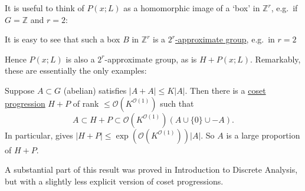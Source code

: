 \documentclass{article}
\numberwithin{equation}{section}
\begin{document}
It is useful to think of \hyperlink{def:prog}{$P(x;L)$} as a homomorphic image of a `box' in $\mathbb{Z}^r$, e.g.\ if $G = \mathbb{Z}$ and $r = 2$:
\begin{center}
\end{center}
It is easy to see that such a box $B$ in $\mathbb{Z}^r$ is a \hyperlink{def:appGroup}{$2^r$-approximate group}, e.g.\ in $r=2$

\begin{center}
\end{center}

Hence \hyperlink{def:prog}{$P(x;L)$} is also a $2^r$-approximate group, as is $H + P(x;L)$.
Remarkably, these are essentially the only examples:

\begin{nthm}[Freiman ($G=\mathbb{Z}$); Green-Ruzsa (arbitrary abelian $G$)]\label{thm:5.1}
  Suppose $A \subset G$ (abelian) satisfies $|A+A| \leq K|A|$.
  Then there is a \hyperlink{def:prog}{coset progression} $H+P$ of rank $\leq \mathcal{O}(K^{\mathcal{O}(1)})$ such that
  \begin{equation*}
    A \subset H + P \subset \mathcal{O}(K^{\mathcal{O}(1)}) (A \cup \{0\} \cup -A).
  \end{equation*}
  In particular,  gives $|H+P| \leq \exp(\mathcal{O}(K^{\mathcal{O}(1)})) |A|$.
  So $A$ is a large proportion of $H+P$.
\end{nthm}

A substantial part of this result was proved in Introduction to Discrete Analysis, but with a slightly less explicit version of coset progressions.
\end{document}
